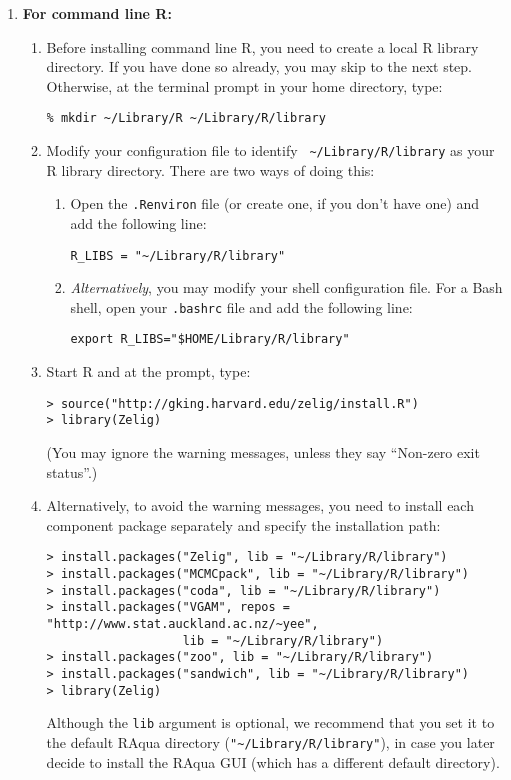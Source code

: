 \begin{enumerate}
\begin{enumerate}
\end{enumerate}

\item {\bf For command line R:} 
  \begin{enumerate}
  \item Before installing command line R, you need to create a local R
    library directory.  If you have done so already, you may skip to
    the next step.  Otherwise, at the terminal prompt in your home
    directory, type:
\begin{verbatim}
% mkdir ~/Library/R ~/Library/R/library
\end{verbatim}
  \item Modify your configuration file to identify {\tt
      \~{}/Library/R/library} as your R library directory.  There are
    two ways of doing this:
    \begin{enumerate}
    \item Open the {\tt .Renviron} file (or create one, if you don't
      have one) and add the following line:
\begin{verbatim} 
R_LIBS = "~/Library/R/library"
\end{verbatim}
    \item {\it Alternatively}, you may modify your shell configuration
      file.  For a Bash shell, open your {\tt .bashrc} file and add
      the following line:
\begin{verbatim}
export R_LIBS="$HOME/Library/R/library"
\end{verbatim} %
      \end{enumerate}
    \item Start R and at the prompt, type:
\begin{verbatim}
> source("http://gking.harvard.edu/zelig/install.R")
> library(Zelig)
\end{verbatim}
(You may ignore the warning messages, unless they say ``Non-zero exit 
status''.)
\item Alternatively, to avoid the warning messages, you need to install 
each component package separately and specify the installation path:
\begin{verbatim}
> install.packages("Zelig", lib = "~/Library/R/library")
> install.packages("MCMCpack", lib = "~/Library/R/library")
> install.packages("coda", lib = "~/Library/R/library")
> install.packages("VGAM", repos = "http://www.stat.auckland.ac.nz/~yee",
                   lib = "~/Library/R/library")
> install.packages("zoo", lib = "~/Library/R/library")
> install.packages("sandwich", lib = "~/Library/R/library")
> library(Zelig)
\end{verbatim}
      Although the {\tt lib} argument is optional, we recommend that
      you set it to the default RAqua directory
      (\verb|"~/Library/R/library"|), in case you later decide to
      install the RAqua GUI (which has a different default directory).
      \end{enumerate}
\end{enumerate}
  
